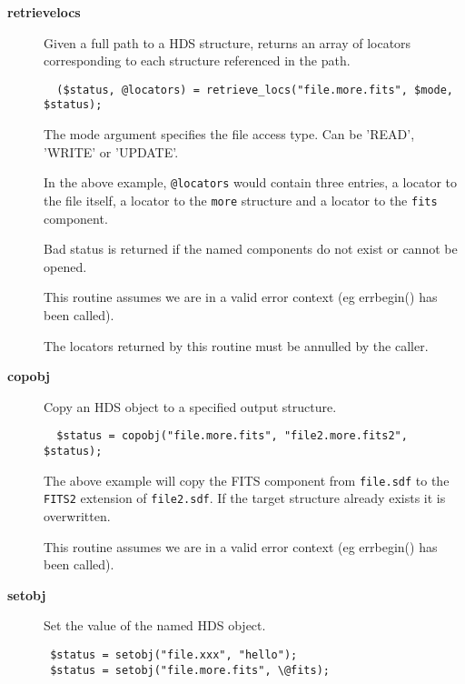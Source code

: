 \documentclass[twoside,11pt]{article}
\renewcommand{\_}{\texttt{\symbol{95}}}
\begin{document}
\begin{description}

\item[\textbf{retrieve\_locs}] \mbox{}

Given a full path to a HDS structure, returns an array of 
locators corresponding to each structure referenced in the path.

\begin{verbatim}
  ($status, @locators) = retrieve_locs("file.more.fits", $mode, $status);
\end{verbatim}


The mode argument specifies the file access type. Can be 'READ', 'WRITE'
or 'UPDATE'.



In the above example, \texttt{@locators} would contain three entries,
a locator to the file itself, a locator to the \texttt{more} structure
and a locator to the \texttt{fits} component.



Bad status is returned if the named components do not exist or cannot
be opened.



This routine assumes we are in a valid error context (eg err\_begin()
has been called).



The locators returned by this routine must be annulled by the caller.


\item[\textbf{copobj}] \mbox{}

Copy an HDS object to a specified output structure.

\begin{verbatim}
  $status = copobj("file.more.fits", "file2.more.fits2", $status);
\end{verbatim}


The above example will copy the FITS component from \texttt{file.sdf} to
the \texttt{FITS2} extension of \texttt{file2.sdf}. If the target structure
already exists it is overwritten.



This routine assumes we are in a valid error context (eg err\_begin()
has been called).


\item[\textbf{setobj}] \mbox{}

Set the value of the named HDS object.

\begin{verbatim}
 $status = setobj("file.xxx", "hello");
 $status = setobj("file.more.fits", \@fits);
\end{verbatim}



\end{description}
\end{document}
